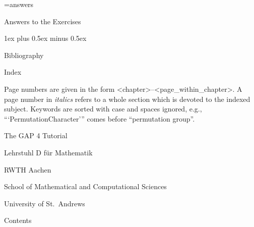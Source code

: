 
\immediate\openout\ans=answers

\FrontMatter
%

\Chapters
{}

\Appendices

\Chapter Answers to the Exercises

\parindent\manindent
\parskip 1ex plus 0.5ex minus 0.5ex
\immediate\closeout\ans


\Chapter Bibliography

\Bibliography

\Chapter Index

Page numbers are given in the form <chapter>--<page_within_chapter>. A
page number  in   {\it italics} refers  to a   whole section which  is
devoted  to the indexed subject.  Keywords  are  sorted with case  and
spaces    ignored, e.g.,  ```PermutationCharacter'''   comes    before
``permutation group''.

\Index

\undoquotes
\null\vfill
\centerline{\titlefont The GAP 4 Tutorial}
\bigskip
\centerline{\secfont Lehrstuhl D f\"ur Mathematik}
\smallskip
\centerline{\secfont RWTH Aachen}
\bigskip
\centerline{\secfont School of Mathematical and Computational
Sciences}
\smallskip
\centerline{\secfont University of St.~Andrews}

\Chapter Contents

\medskip

\TableOfContents

\bye
